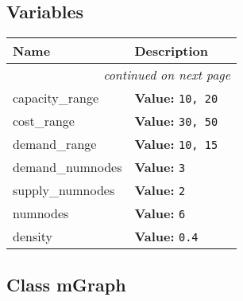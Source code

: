   \subsection{Variables}

    \vspace{-1cm}
\hspace{\varindent}\begin{longtable}{|p{\varnamewidth}|p{\vardescrwidth}|l}
\cline{1-2}
\cline{1-2} \centering \textbf{Name} & \centering \textbf{Description}& \\
\cline{1-2}
\endhead\cline{1-2}\multicolumn{3}{r}{\small\textit{continued on next page}}\\\endfoot\cline{1-2}
\endlastfoot\raggedright c\-a\-p\-a\-c\-i\-t\-y\-\_\-r\-a\-n\-g\-e\- & \raggedright \textbf{Value:} 
{\tt 10, 20}&\\
\cline{1-2}
\raggedright c\-o\-s\-t\-\_\-r\-a\-n\-g\-e\- & \raggedright \textbf{Value:} 
{\tt 30, 50}&\\
\cline{1-2}
\raggedright d\-e\-m\-a\-n\-d\-\_\-r\-a\-n\-g\-e\- & \raggedright \textbf{Value:} 
{\tt 10, 15}&\\
\cline{1-2}
\raggedright d\-e\-m\-a\-n\-d\-\_\-n\-u\-m\-n\-o\-d\-e\-s\- & \raggedright \textbf{Value:} 
{\tt 3}&\\
\cline{1-2}
\raggedright s\-u\-p\-p\-l\-y\-\_\-n\-u\-m\-n\-o\-d\-e\-s\- & \raggedright \textbf{Value:} 
{\tt 2}&\\
\cline{1-2}
\raggedright n\-u\-m\-n\-o\-d\-e\-s\- & \raggedright \textbf{Value:} 
{\tt 6}&\\
\cline{1-2}
\raggedright d\-e\-n\-s\-i\-t\-y\- & \raggedright \textbf{Value:} 
{\tt 0.4}&\\
\cline{1-2}
\end{longtable}



\subsection{Class mGraph}

